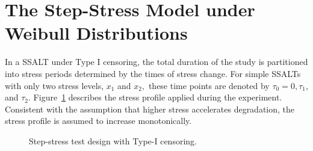 \documentclass{article}
\begin{document}
\section{The Step-Stress Model under Weibull Distributions}

In a SSALT under Type I censoring, the total duration of the study is partitioned into stress periods determined by the times of stress change. For simple SSALTs with only two stress levels,  $ x_1 $ and $ x_2, $ these  time points are denoted by $ \tau_0 = 0, \tau_1 $, and $ \tau_2 $.  Figure~\ref{fig:step-stress} describes the stress profile applied during the experiment.
Consistent with the assumption that higher stress accelerates degradation, the stress profile is assumed to increase monotonically.

\begin{figure}[htb]
\centering
{}
  \caption{Step-stress test design with Type-I censoring.}
  \label{fig:step-stress}
\end{figure}
\end{document}
